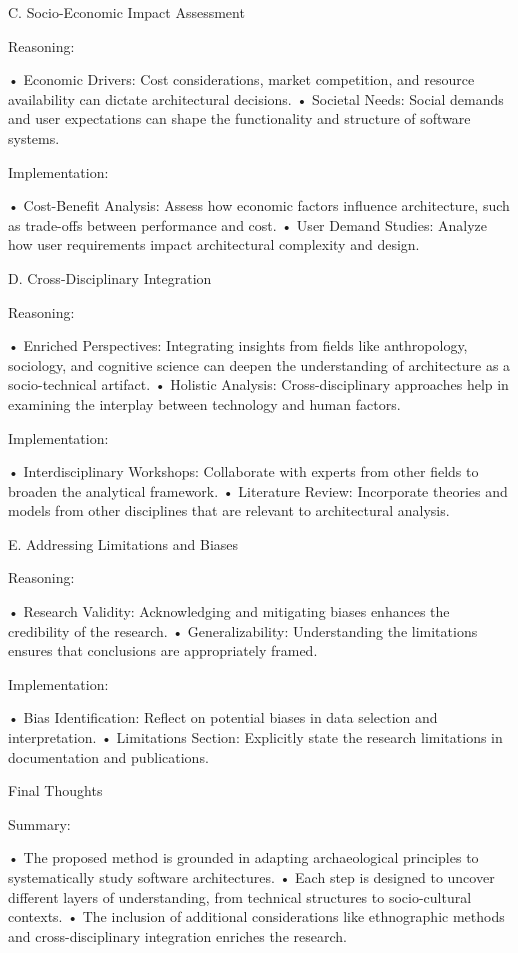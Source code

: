 C. Socio-Economic Impact Assessment

Reasoning:

	•	Economic Drivers: Cost considerations, market competition, and resource availability can dictate architectural decisions.
	•	Societal Needs: Social demands and user expectations can shape the functionality and structure of software systems.

Implementation:

	•	Cost-Benefit Analysis: Assess how economic factors influence architecture, such as trade-offs between performance and cost.
	•	User Demand Studies: Analyze how user requirements impact architectural complexity and design.

D. Cross-Disciplinary Integration

Reasoning:

	•	Enriched Perspectives: Integrating insights from fields like anthropology, sociology, and cognitive science can deepen the understanding of architecture as a socio-technical artifact.
	•	Holistic Analysis: Cross-disciplinary approaches help in examining the interplay between technology and human factors.

Implementation:

	•	Interdisciplinary Workshops: Collaborate with experts from other fields to broaden the analytical framework.
	•	Literature Review: Incorporate theories and models from other disciplines that are relevant to architectural analysis.

E. Addressing Limitations and Biases

Reasoning:

	•	Research Validity: Acknowledging and mitigating biases enhances the credibility of the research.
	•	Generalizability: Understanding the limitations ensures that conclusions are appropriately framed.

Implementation:

	•	Bias Identification: Reflect on potential biases in data selection and interpretation.
	•	Limitations Section: Explicitly state the research limitations in documentation and publications.

Final Thoughts

Summary:

	•	The proposed method is grounded in adapting archaeological principles to systematically study software architectures.
	•	Each step is designed to uncover different layers of understanding, from technical structures to socio-cultural contexts.
	•	The inclusion of additional considerations like ethnographic methods and cross-disciplinary integration enriches the research.

